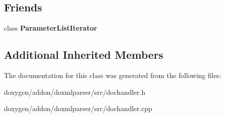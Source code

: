 \subsection*{Friends}
\begin{DoxyCompactItemize}
\item 
\mbox{\label{class_parameter_list_handler_a6ec6d833a9d9c09a3b8e37a69549ad9c}} 
class {\bfseries Parameter\+List\+Iterator}
\end{DoxyCompactItemize}
\subsection*{Additional Inherited Members}


The documentation for this class was generated from the following files\+:\begin{DoxyCompactItemize}
\item 
doxygen/addon/doxmlparser/src/dochandler.\+h\item 
doxygen/addon/doxmlparser/src/dochandler.\+cpp\end{DoxyCompactItemize}
